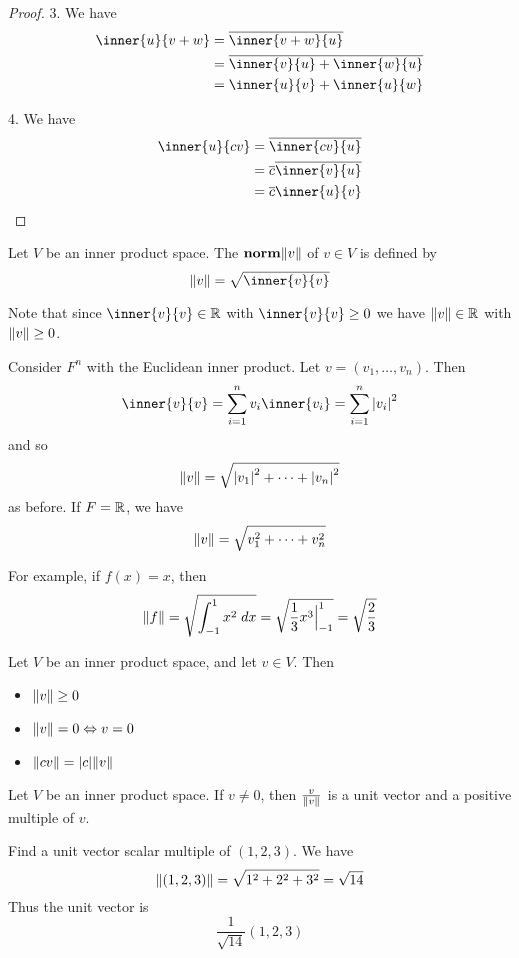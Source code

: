 \documentclass{article}
\begin{document}
\begin{proof}
  3. We have
  \begin{align*}
    \inner{u}{v+w} & = \overline{\inner{v+w}{u}}              \\
                   & = \overline{\inner{v}{u} + \inner{w}{u}} \\
                   & = \inner{u}{v} + \inner{u}{w}            \\
  \end{align*}

  4. We have
  \begin{align*}
    \inner{u}{cv} & = \overline{\inner{cv}{u}}            \\
                  & = \overline{c}\overline{\inner{v}{u}} \\
                  & = \overline{c}\inner{u}{v}
  \end{align*}
\end{proof}
\begin{definition}
  Let $V$ be an inner product space. The $\textbf{norm} \norm{v}$ of $v \in V$ is defined by \[
    \norm{v} = \sqrt{\inner{v}{v}}
  \]

  Note that since $\inner{v}{v} \in \R$ with $\inner{v}{v} \geq 0$ we have $\norm{v} \in \mathbb{R}$ with $\norm{v} \geq 0$.
\end{definition}
\begin{example}
  Consider $F^n$ with the Euclidean inner product. Let $v = (v_1, \ldots, v_n)$. Then \[
    \inner{v}{v} = \sum_{i=1}^n v_i\inner{v_i} = \sum_{i=1}^n \abs{v_i}^2
  \] and so \[
    \norm{v} = \sqrt{\abs{v_1}^2 + \dots + \abs{v_n}^2}
  \] as before. If $F = \mathbb{R}$, we have \[
    \norm{v} = \sqrt{v_1^2 + \dots + v_n^2}
  \]

  For example, if $f(x) = x$, then \[
    \norm{f} = \sqrt{\int_{-1}^1 x^2 \; dx} = \sqrt{\frac{1}{3}x^3\Big|_{-1}^1} = \sqrt{\frac{2}{3}}
  \]
\end{example}
\begin{theorem}
  Let $V$ be an inner product space, and let $v \in V$. Then
  \begin{itemize}
    \item $\norm{v} \geq 0$
    \item $\norm{v} = 0 \Leftrightarrow v = 0$
    \item $\norm{cv} = \abs{c}\norm{v}$
  \end{itemize}
\end{theorem}
\begin{theorem}
  Let $V$ be an inner product space. If $v \neq 0$, then $\frac{v}{\norm{v}}$ is a unit vector and a positive multiple of $v$.
\end{theorem}
\begin{example}
  Find a unit vector scalar multiple of $(1, 2, 3)$.
  We have \[
    \norm{(1, 2, 3)} = \sqrt{1^2 + 2^2 + 3^2} = \sqrt{14}
  \]
  Thus the unit vector is \[
    \frac{1}{\sqrt{14}}(1, 2, 3)
  \]
\end{example}
\end{document}
